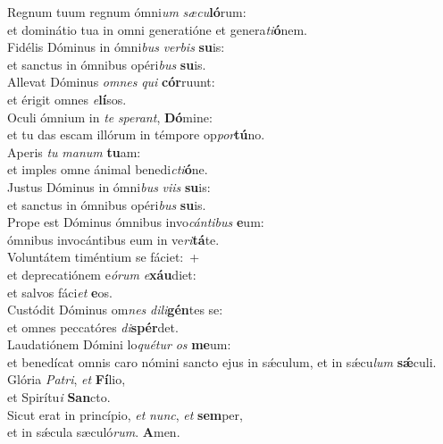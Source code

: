 \oddverse Regnum tuum regnum ómni\textit{um} \textit{sæ}\textit{cu}\textbf{ló}rum:~\*\\
\oddverse et dominátio tua in omni generatióne et genera\textit{ti}\textbf{ó}nem.\\
\evenverse Fidélis Dóminus in ómni\textit{bus} \textit{ver}\textit{bis} \textbf{su}is:~\*\\
\evenverse et sanctus in ómnibus opéri\textit{bus} \textbf{su}is.\\
\oddverse Allevat Dóminus \textit{om}\textit{nes} \textit{qui} \textbf{cór}ruunt:~\*\\
\oddverse et érigit omnes \textit{e}\textbf{lí}sos.\\
\evenverse Oculi ómnium in \textit{te} \textit{spe}\textit{rant}, \textbf{Dó}mine:~\*\\
\evenverse et tu das escam illórum in témpore op\textit{por}\textbf{tú}no.\\
\oddverse Aperis \textit{tu} \textit{ma}\textit{num} \textbf{tu}am:~\*\\
\oddverse et imples omne ánimal benedi\textit{cti}\textbf{ó}ne.\\
\evenverse Justus Dóminus in ómni\textit{bus} \textit{vi}\textit{is} \textbf{su}is:~\*\\
\evenverse et sanctus in ómnibus opéri\textit{bus} \textbf{su}is.\\
\oddverse Prope est Dóminus ómnibus invo\textit{cán}\textit{ti}\textit{bus} \textbf{e}um:~\*\\
\oddverse ómnibus invocántibus eum in ve\textit{ri}\textbf{tá}te.\\
\evenverse Voluntátem timéntium se fáciet:~+\\
\evenverse  et deprecatiónem e\textit{ó}\textit{rum} \textit{e}\textbf{xáu}diet:~\*\\
\evenverse et salvos fáci\textit{et} \textbf{e}os.\\
\oddverse Custódit Dóminus om\textit{nes} \textit{di}\textit{li}\textbf{gén}tes se:~\*\\
\oddverse et omnes peccatóres \textit{di}\textbf{spér}det.\\
\evenverse Laudatiónem Dómini lo\textit{qué}\textit{tur} \textit{os} \textbf{me}um:~\*\\
\evenverse et benedícat omnis caro nómini sancto ejus in sǽculum, et in sǽcu\textit{lum} \textbf{sǽ}culi.\\
\oddverse Glória \textit{Pa}\textit{tri}, \textit{et} \textbf{Fí}lio,~\*\\
\oddverse et Spirítu\textit{i} \textbf{San}cto.\\
\evenverse Sicut erat in princípio, \textit{et} \textit{nunc}, \textit{et} \textbf{sem}per,~\*\\
\evenverse et in sǽcula sæculó\textit{rum}. \textbf{A}men.\\
